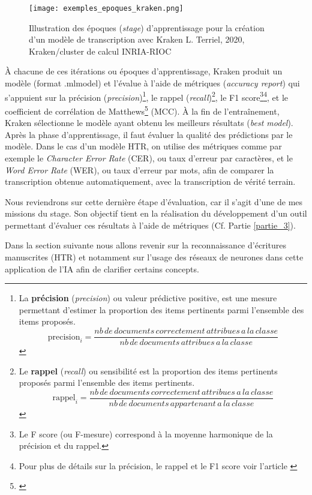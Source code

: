 \begin{figure}[h]
    \centering
    \centerline{\texttt{[image: exemples\_epoques\_kraken.png]}}
    \caption{Illustration des époques (\textit{stage}) d'apprentissage pour la création d'un modèle de transcription avec Kraken \textcopyright L. Terriel, 2020, Kraken/cluster de calcul INRIA-RIOC}
    \label{fig:epoque_kraken_prompt}
\end{figure}
\newpage
À chacune de ces itérations ou époques d'apprentissage, Kraken produit un modèle (format .mlmodel) et l'évalue à l'aide de métriques (\textit{accuracy report}) qui s'appuient sur la précision (\textit{precision})\footnote{La \textbf{précision} (\textit{precision}) ou valeur prédictive positive, est une mesure permettant d'estimer la proportion des items pertinents parmi l'ensemble des items proposés. 
$$\text{precision}_i = \frac{nb\,de\,documents\,correctement\,attribues\,a\,la\,classe}{nb\,de\,documents\,attribues\,a\,la\,classe}$$}, le rappel (\textit{recall})\footnote{Le \textbf{rappel} (\textit{recall}) ou sensibilité est la proportion des items pertinents proposés parmi l'ensemble des items pertinents.
$$ \text{rappel}_i = \frac{nb\,de\,documents\,correctement\,attribues\,a\,la\,classe}{nb\,de\,documents\,appartenant\,a\,la\,classe} $$}, le F1 score\footnote{Le F score (ou F-mesure) correspond à la moyenne harmonique de la précision et du rappel.}\footnote{Pour plus de détails sur la précision, le rappel et le F1 score voir l'article \cite{wikipedia_precision_nodate}}, et le coefficient de corrélation de Matthews\footnote{\cite{wikipedia_matthews_nodate}} (MCC). À la fin de l'entraînement, Kraken sélectionne le modèle ayant obtenu les meilleurs résultats (\textit{best model}).\\

Après la phase d'apprentissage, il faut évaluer la qualité des prédictions par le modèle. Dans le cas d'un modèle HTR, on utilise des métriques comme par exemple le \textit{Character Error Rate} (CER), ou taux d'erreur par caractères, et le \textit{Word Error Rate} (WER), ou taux d'erreur par mots, afin de comparer la transcription obtenue automatiquement, avec la transcription de vérité terrain. 

Nous reviendrons sur cette dernière étape d'évaluation, car il s'agit d'une de mes missions du stage. Son objectif tient en la réalisation du développement d'un outil permettant d'évaluer ces résultats à l'aide de métriques (Cf. Partie \ref{partie_3}).

Dans la section suivante nous allons revenir sur la reconnaissance d'écritures manuscrites (HTR) et notamment sur l'usage des réseaux de neurones dans cette application de l'IA afin de clarifier certains concepts.
\newpage
